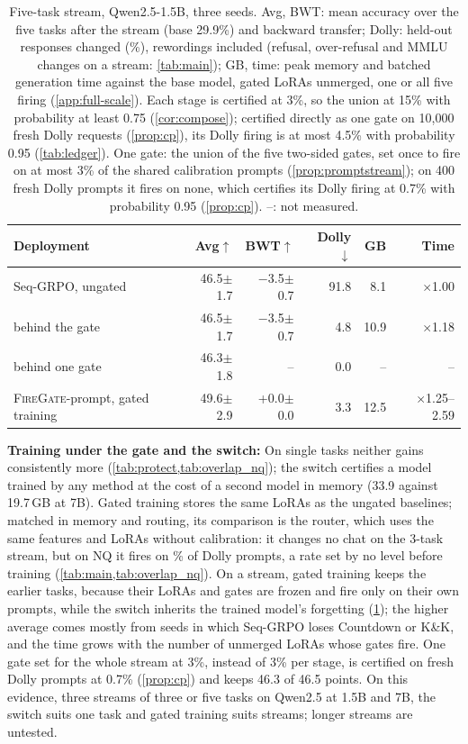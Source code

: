 \documentclass{article}
\theoremstyle{plain}
\theoremstyle{definition}
\theoremstyle{remark}
\newcommand{\methodp}{\textsc{FireGate}-prompt}
\begin{document}
\begin{table}[t]
\centering
\scriptsize
\setlength{\tabcolsep}{1.6pt}
\caption{Five-task stream, Qwen2.5-1.5B, three seeds. Avg, BWT: mean accuracy over the five tasks after the stream
(base 29.9\%) and backward transfer; Dolly: held-out responses changed (\%), rewordings included (refusal,
over-refusal and MMLU changes on a stream: \cref{tab:main}); GB, time: peak memory and batched
generation time against the base model, gated LoRAs unmerged, one or all five firing (\cref{app:full-scale}). Each
stage is certified at 3\%, so the union at 15\% with probability at least 0.75 (\cref{cor:compose}); certified directly as
one gate on 10{,}000 fresh Dolly requests (\cref{prop:cp}), its Dolly firing is at most 4.5\% with probability 0.95
(\cref{tab:ledger}). One gate: the union of the five two-sided gates, set once to fire on at most 3\% of the shared
calibration prompts (\cref{prop:promptstream}); on 400 fresh Dolly prompts it fires on none, which certifies its Dolly
firing at 0.7\% with probability 0.95 (\cref{prop:cp}). --: not measured.}
\label{tab:deploy}
\begin{tabular}{l rr r r r}
\toprule
Deployment & Avg$\uparrow$ & BWT$\uparrow$ & Dolly$\downarrow$ & GB & Time \\
\midrule
Seq-GRPO, ungated & 46.5{\tiny$\pm$1.7} & $-$3.5{\tiny$\pm$0.7} & 91.8 & 8.1 & $\times$1.00 \\
\quad behind the gate & 46.5{\tiny$\pm$1.7} & $-$3.5{\tiny$\pm$0.7} & 4.8 & 10.9 & $\times$1.18 \\
\quad behind one gate & 46.3{\tiny$\pm$1.8} & -- & 0.0 & -- & -- \\
\methodp{}, gated training & 49.6{\tiny$\pm$2.9} & +0.0{\tiny$\pm$0.0} & 3.3 & 12.5 & $\times$1.25--2.59 \\
\bottomrule
\end{tabular}
\end{table}

\textbf{Training under the gate and the switch:} On single tasks neither gains consistently more
(\cref{tab:protect,tab:overlap_nq}); the switch certifies a model trained by any method at the cost of a second model
in memory (33.9 against 19.7\,GB at 7B). Gated training stores the same LoRAs as the ungated baselines; matched in memory and routing, its comparison is the router, which uses the same features and LoRAs without calibration: it changes no chat on the 3-task stream, but on NQ it fires on \ovlRouterFireDolly\% of Dolly prompts, a rate set by no level before training (\cref{tab:main,tab:overlap_nq}). On a stream, gated training keeps the earlier tasks, because their LoRAs and
gates are frozen and fire only on their own prompts, while the switch inherits the trained model's forgetting
(\cref{tab:deploy}); the higher average comes mostly from seeds in which Seq-GRPO loses Countdown or K\&K, and the time
grows with the number of unmerged LoRAs whose gates fire. One gate set for the whole stream at 3\%,
instead of 3\% per stage, is certified on fresh Dolly prompts at 0.7\% (\cref{prop:cp}) and keeps 46.3 of 46.5
points. On this evidence, three streams of three or five tasks on Qwen2.5 at 1.5B and 7B, the switch suits one task and gated training suits streams; longer streams are untested.
\end{document}
